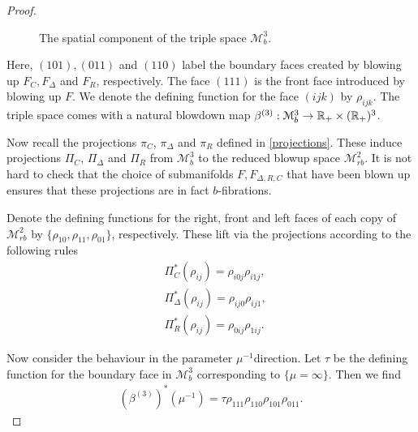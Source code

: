 \begin{proof}
\begin{figure}[h]
\begin{center}
\end{center}
\label{triple-space}
\caption{The spatial component of the triple space $\mathscr{M}^3_b$.}
\end{figure} 


Here, $(101), (011)$ and $(110)$ label the boundary faces created by blowing up $F_C, F_\Delta$ and $F_R$, respectively. 
The face $(111)$ is the front face introduced by blowing up $F$. We denote the defining function for the face $(ijk)$  
by $\rho_{ijk}$. The triple space comes with a natural blowdown map 
$\beta^{(3)}: \mathcal{M}^3_b \to \mathbb{R}_+ \times (\mathbb{R}_+)^3$. 

Now recall the projections $\pi_C$, $\pi_\Delta$ and $\pi_R$ defined in \eqref{projections}.  
These induce projections $\Pi_C$, $\Pi_\Delta$ and $\Pi_R$ from 
$\mathscr{M}^3_b$ to the reduced blowup space $\mathscr{M}^2_{rb}$. 
It is not hard to check that the choice of submanifolds $F, F_{\Delta,R,C}$ that have been blown up ensures that these 
projections are in fact $b$-fibrations. 

Denote the defining functions for the right, front and left faces of each copy of $\mathscr{M}^2_{rb}$ by 
$\{\rho_{10}, \rho_{11}, \rho_{01}\}$, respectively.  These lift via the projections according to the following rules
\begin{equation}
\begin{split}
&\Pi_C^*(\rho_{ij})=\rho_{i0j}\rho_{i1j}, \\ 
&\Pi_\Delta^*(\rho_{ij})=\rho_{ij0}\rho_{ij1}, \\ 
&\Pi_R^*(\rho_{ij})=\rho_{0ij}\rho_{1ij}.
\end{split}
\label{RLC}
\end{equation}

Now consider the behaviour in the parameter $\mu^{-1}$direction. Let $\tau$ be the defining function 
for the boundary face in $\mathscr{M}^3_b$ corresponding to $\{\mu=\infty\}$. 
Then we find 
\begin{align}
\label{beta-tau}
(\beta^{(3)})^*(\mu^{-1}) = \tau \rho_{111} \rho_{110} \rho_{101} \rho_{011}.
\end{align} 


\end{proof}
